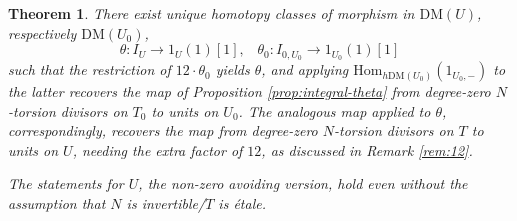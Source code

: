 \documentclass[a4paper,reqno,11pt]{amsart}
\theoremstyle{plain}
\newtheorem{theorem}{Theorem}[section]
\theoremstyle{definition}
\theoremstyle{remark}
\newcommand{\DM}{\mathrm{DM}}
\newcommand{\Hom}{\mathrm{Hom}}
\begin{document}
\begin{theorem} \label{thm:motivic-integral-theta}
    There exist unique homotopy classes of morphism in $\DM(U)$, respectively $\DM(U_0)$,
    \[
    \theta: I_U\to 1_U(1)[1], \;\;\; \theta_0: I_{0, U_0} \to 1_{U_0}(1)[1] 
    \]
    such that the restriction of $12\cdot \theta_0$ yields $\theta$, and applying $\Hom_{h\DM(U_0)}(1_{U_0,-})$ to the latter recovers the map of Proposition \ref{prop:integral-theta} from degree-zero $N$-torsion divisors on $T_0$ to units on $U_0$. The analogous map applied to $\theta$, correspondingly, recovers the map from degree-zero $N$-torsion divisors on $T$ to units on $U$, needing the extra factor of $12$, as discussed in Remark \ref{rem:12}.

    The statements for $U$, the non-zero avoiding version, hold even without the assumption that $N$ is invertible/$T$ is \'{e}tale.
\end{theorem}
\end{document}
